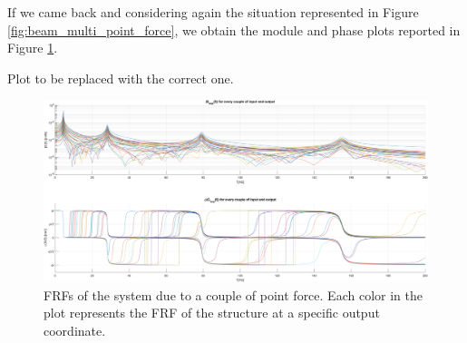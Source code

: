 If we came back and considering again the situation represented in Figure \ref{fig:beam_multi_point_force}, we obtain the module and phase plots reported in Figure \ref{fig:FRFs_multi_point_force}.

\begin{center}
    \huge{Plot to be replaced with the correct one.}
\end{center}

\begin{figure}[H]
    \centering
    \includegraphics[width=\textwidth]{img/MATLAB/Part_A/Experimental_FRF_couple_all.png}
    \caption{FRFs of the system due to a couple of point force. Each color in the plot represents the FRF of the structure at a specific output coordinate.}
    \label{fig:FRFs_multi_point_force}
\end{figure}
